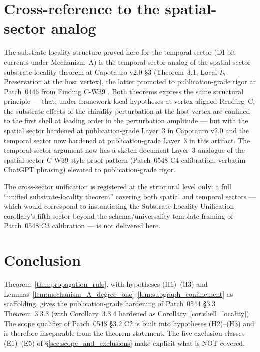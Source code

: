 \documentclass[11pt,letterpaper]{article}
\begin{document}
\section{Cross-reference to the spatial-sector analog}\label{sec:cross_reference}

The substrate-locality structure proved here for the temporal sector (DI-bit currents under Mechanism~A) is the temporal-sector analog of the spatial-sector substrate-locality theorem at Capotauro v2.0 \S3 (Theorem~3.1, Local-$I_h$-Preservation at the host vertex), the latter promoted to publication-grade rigor at Patch~0446 from Finding C-W39 \cite{abshier_capotauro_chiral_mechanism_sketch}. Both theorems express the same structural principle --- that, under framework-local hypotheses at vertex-aligned Reading~C, the substrate effects of the chirality perturbation at the host vertex are confined to the first shell at leading order in the perturbation amplitude --- but with the spatial sector hardened at publication-grade Layer~3 in Capotauro v2.0 and the temporal sector now hardened at publication-grade Layer~3 in this artifact. The temporal-sector argument now has a sketch-document Layer~3 analogue of the spatial-sector C-W39-style proof pattern (Patch~0548 C4 calibration, verbatim ChatGPT phrasing) elevated to publication-grade rigor.

The cross-sector unification is registered at the structural level only: a full ``unified substrate-locality theorem'' covering both spatial and temporal sectors --- which would correspond to instantiating the Substrate-Locality Unification corollary's fifth sector beyond the schema/universality template framing of Patch~0548 C3 calibration --- is not delivered here.

\section{Conclusion}\label{sec:conclusion}

Theorem~\ref{thm:propagation_rule}, with hypotheses (H1)--(H3) and Lemmas~\ref{lem:mechanism_A_degree_one}--\ref{lem:subgraph_confinement} as scaffolding, gives the publication-grade hardening of Patch~0544 \S3.3 Theorem~3.3.3 (with Corollary~3.3.4 hardened as Corollary~\ref{cor:shell_locality}). The scope qualifier of Patch~0548 \S3.2 C2 is built into hypotheses (H2)--(H3) and is therefore inseparable from the theorem statement. The five exclusion classes (E1)--(E5) of \S\ref{sec:scope_and_exclusions} make explicit what is NOT covered.
\end{document}
